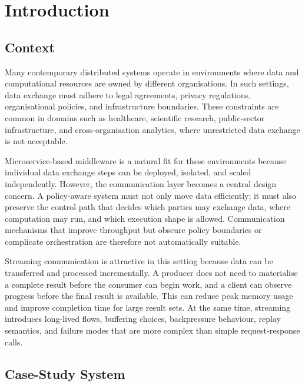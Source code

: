 \chapter{Introduction}\label{ch:introduction}

\section{Context}

Many contemporary distributed systems operate in environments where data and computational resources are owned by different organisations. In such settings, data exchange must adhere to legal agreements, privacy regulations, organisational policies, and infrastructure boundaries. These constraints are common in domains such as healthcare, scientific research, public-sector infrastructure, and cross-organisation analytics, where unrestricted data exchange is not acceptable.

Microservice-based middleware is a natural fit for these environments because individual data exchange steps can be deployed, isolated, and scaled independently. However, the communication layer becomes a central design concern. A policy-aware system must not only move data efficiently; it must also preserve the control path that decides which parties may exchange data, where computation may run, and which execution shape is allowed. Communication mechanisms that improve throughput but obscure policy boundaries or complicate orchestration are therefore not automatically suitable.

Streaming communication is attractive in this setting because data can be transferred and processed incrementally. A producer does not need to materialise a complete result before the consumer can begin work, and a client can observe progress before the final result is available. This can reduce peak memory usage and improve completion time for large result sets. At the same time, streaming introduces long-lived flows, buffering choices, backpressure behaviour, replay semantics, and failure modes that are more complex than simple request-response calls.

\section{Case-Study System}

